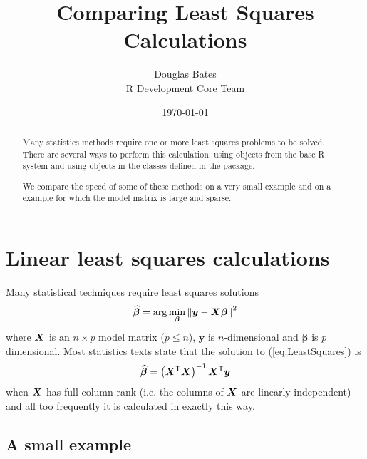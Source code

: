 \documentclass{article}
\begin{document}
\title{Comparing Least Squares Calculations}
\author{Douglas Bates\\R Development Core Team\\}
\date{\today}
\maketitle
\begin{abstract}
  Many statistics methods require one or more least squares problems
  to be solved.  There are several ways to perform this calculation,
  using objects from the base R system and using objects in the
  classes defined in the  package.
  
  We compare the speed of some of these methods on a very small
  example and on a example for which the model matrix is large and
  sparse.
\end{abstract}

\section{Linear least squares calculations}
\label{sec:LeastSquares}

Many statistical techniques require least squares solutions
\begin{equation}
  \label{eq:LeastSquares}
  \widehat{\bm{\beta}}=
  \arg\min_{\bm{\beta}}\left\|\bm{y}-\bm{X}\bm{\beta}\right\|^2
\end{equation}
where $\bm{X}$ is an $n\times p$ model matrix ($p\leq n$), $\bm{y}$ is
$n$-dimensional and $\bm{\beta}$ is $p$ dimensional.  Most statistics
texts state that the solution to (\ref{eq:LeastSquares}) is
\begin{equation}
  \label{eq:XPX}
  \widehat{\bm{\beta}}=\left(\bm{X}^\mathsf{T}\bm{X}\right)^{-1}\bm{X}^\mathsf{T}\bm{y}
\end{equation}
when $\bm{X}$ has full column rank (i.e. the columns of $\bm{X}$ are
linearly independent) and all too frequently it is calculated in
exactly this way.


\subsection{A small example}
\label{sec:smallLSQ}
\end{document}

